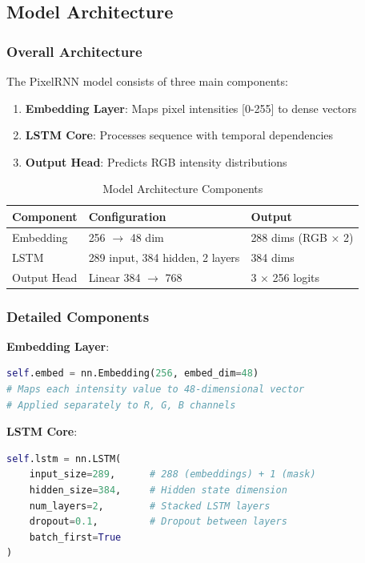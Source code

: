 \documentclass[12pt,a4paper]{article}
\begin{document}
\subsection{Model Architecture}

\subsubsection{Overall Architecture}

The PixelRNN model consists of three main components:

\begin{enumerate}
    \item \textbf{Embedding Layer}: Maps pixel intensities [0-255] to dense vectors
    \item \textbf{LSTM Core}: Processes sequence with temporal dependencies
    \item \textbf{Output Head}: Predicts RGB intensity distributions
\end{enumerate}

\begin{table}[H]
\centering
\caption{Model Architecture Components}
\begin{tabular}{@{}lll@{}}
\toprule
\textbf{Component} & \textbf{Configuration} & \textbf{Output} \\ \midrule
Embedding & 256 $\rightarrow$ 48 dim & 288 dims (RGB × 2) \\
LSTM & 289 input, 384 hidden, 2 layers & 384 dims \\
Output Head & Linear 384 $\rightarrow$ 768 & 3 × 256 logits \\ \bottomrule
\end{tabular}
\end{table}

\subsubsection{Detailed Components}

\textbf{Embedding Layer}:
\begin{lstlisting}[language=Python, caption=Embedding Configuration]
self.embed = nn.Embedding(256, embed_dim=48)
# Maps each intensity value to 48-dimensional vector
# Applied separately to R, G, B channels
\end{lstlisting}

\textbf{LSTM Core}:
\begin{lstlisting}[language=Python, caption=LSTM Configuration]
self.lstm = nn.LSTM(
    input_size=289,      # 288 (embeddings) + 1 (mask)
    hidden_size=384,     # Hidden state dimension
    num_layers=2,        # Stacked LSTM layers
    dropout=0.1,         # Dropout between layers
    batch_first=True
)
\end{lstlisting}
\end{document}
